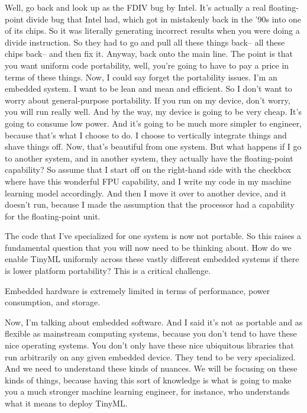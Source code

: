 Well, go back and look up as the FDIV bug by Intel.
It's actually a real floating-point divide bug that Intel had, which got in mistakenly back in the '90s into one of its chips.
So it was literally generating incorrect results when you were doing a divide instruction.
So they had to go and pull all these things back-- all these chips back-- and then fix it.
Anyway, back onto the main line.
The point is that you want uniform code portability, well, you're going to have to pay a price in terms of these things.
Now, I could say forget the portability issues.
I'm an embedded system.
I want to be lean and mean and efficient.
So I don't want to worry about general-purpose portability.
If you run on my device, don't worry, you will run really well.
And by the way, my device is going to be very cheap.
It's going to consume low power.
And it's going to be much more simpler to engineer, because that's what I choose to do.
I choose to vertically integrate things and shave things off.
Now, that's beautiful from one system.
But what happens if I go to another system, and in another system, they actually have the floating-point capability?
So assume that I start off on the right-hand side with the checkbox where have this wonderful FPU capability,
and I write my code in my machine learning model accordingly.
And then I move it over to another device, and it doesn't run, because I made the assumption that the processor had a capability for the floating-point unit.

The code that I've specialized for one system is now not portable.
So this raises a fundamental question that you will now need to be thinking about.
How do we enable TinyML uniformly across these vastly different embedded systems if there is lower platform portability?
This is a critical challenge.


Embedded hardware is extremely limited in terms of performance, power consumption, and storage.

Now, I'm talking about embedded software.
And I said it's not as portable and as flexible as mainstream computing systems, because you don't tend to have these nice operating systems.
You don't only have these nice ubiquitous libraries that run arbitrarily on any given embedded device.
They tend to be very specialized.
And we need to understand these kinds of nuances.
We will be focusing on these kinds of things, because having this sort of knowledge is what is going to make you a much stronger machine learning engineer, for instance, who understands what it means to deploy TinyML.





